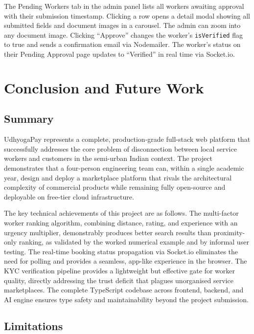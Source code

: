 \documentclass[12pt,a4paper]{report}
\begin{document}
The Pending Workers tab in the admin panel lists all workers awaiting approval with their submission timestamp. Clicking a row opens a detail modal showing all submitted fields and document images in a carousel. The admin can zoom into any document image. Clicking ``Approve'' changes the worker's \texttt{isVerified} flag to true and sends a confirmation email via Nodemailer. The worker's status on their Pending Approval page updates to ``Verified'' in real time via Socket.io.

\chapter{Conclusion and Future Work}

\section{Summary}

UdhyogaPay represents a complete, production-grade full-stack web platform that successfully addresses the core problem of disconnection between local service workers and customers in the semi-urban Indian context. The project demonstrates that a four-person engineering team can, within a single academic year, design and deploy a marketplace platform that rivals the architectural complexity of commercial products while remaining fully open-source and deployable on free-tier cloud infrastructure.

The key technical achievements of this project are as follows. The multi-factor worker ranking algorithm, combining distance, rating, and experience with an urgency multiplier, demonstrably produces better search results than proximity-only ranking, as validated by the worked numerical example and by informal user testing. The real-time booking status propagation via Socket.io eliminates the need for polling and provides a seamless, app-like experience in the browser. The KYC verification pipeline provides a lightweight but effective gate for worker quality, directly addressing the trust deficit that plagues unorganised service marketplaces. The complete TypeScript codebase across frontend, backend, and AI engine ensures type safety and maintainability beyond the project submission.

\section{Limitations}
\end{document}
